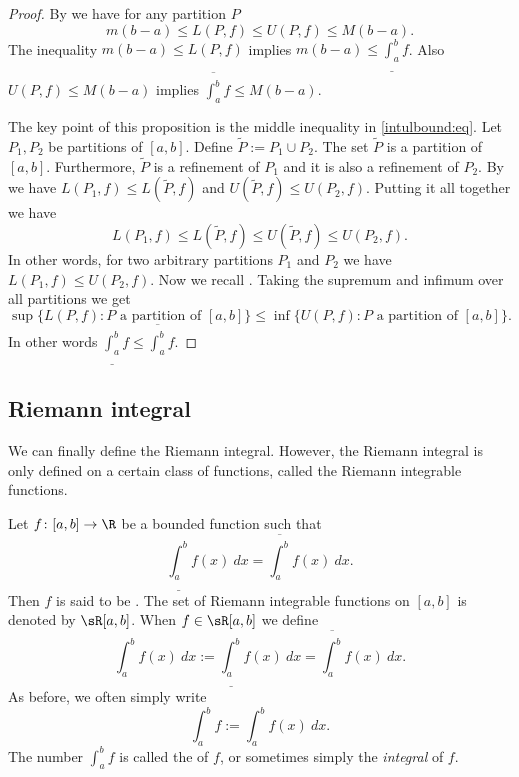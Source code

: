 \documentclass[12pt]{book}
\begin{document}
\begin{proof}
By  we have for any partition $P$
\begin{equation*}
m(b-a) \leq L(P,f) \leq U(P,f) \leq M(b-a).
\end{equation*}
The inequality
$m(b-a) \leq L(P,f)$ implies $m(b-a) \leq \underline{\int_a^b} f$.
Also
$U(P,f) \leq M(b-a)$ implies $\overline{\int_a^b} f \leq M(b-a)$.

The key point of this proposition is the middle inequality in
\eqref{intulbound:eq}.
Let $P_1, P_2$ be partitions of $[a,b]$.
Define 
$\widetilde{P} := P_1 \cup P_2$.
The set $\widetilde{P}$ is a partition of $[a,b]$.
Furthermore,
$\widetilde{P}$ is a refinement of $P_1$ and it is also a refinement of $P_2$.
By 
we have $L(P_1,f) \leq L(\widetilde{P},f)$ and
$U(\widetilde{P},f) \leq U(P_2,f)$.
Putting it all together we have
\begin{equation*}
L(P_1,f) \leq L(\widetilde{P},f) \leq U(\widetilde{P},f) \leq U(P_2,f) .
\end{equation*}
In other words, for two arbitrary partitions $P_1$ and $P_2$ we have
$L(P_1,f) \leq U(P_2,f)$.
Now we recall .
Taking the supremum and
infimum over all partitions we get
\begin{equation*}
\sup \{ L(P,f) : \text{$P$ a partition of $[a,b]$} \}
\leq
\inf \{ U(P,f) : \text{$P$ a partition of $[a,b]$} \} .
\end{equation*}
In other words $\underline{\int_a^b} f \leq \overline{\int_a^b} f$.
\end{proof}

\subsection*{Riemann integral}

We can finally define the Riemann integral.
However, the Riemann
integral is only defined on a certain class of functions, called the
Riemann integrable functions.

\begin{defn}
Let $f \colon [a,b] \to \R$ be a bounded function such that
\begin{equation*}
\underline{\int_a^b} f(x)~dx = \overline{\int_a^b} f(x)~dx .
\end{equation*}
Then $f$ is said to be \emph{}.
The set of Riemann integrable functions on $[a,b]$ is denoted
by $\sR[a,b]$.
When $f \in \sR[a,b]$ we define
\begin{equation*}
\int_a^b f(x)~dx := 
\underline{\int_a^b} f(x)~dx = \overline{\int_a^b} f(x)~dx .
\end{equation*}
As before, we often simply write
\begin{equation*}
\int_a^b f := \int_a^b f(x)~dx.
\end{equation*}
The number $\int_a^b f$ is called the \emph{}
of $f$, or sometimes simply the \emph{integral} of $f$.
\end{defn}
\end{document}
